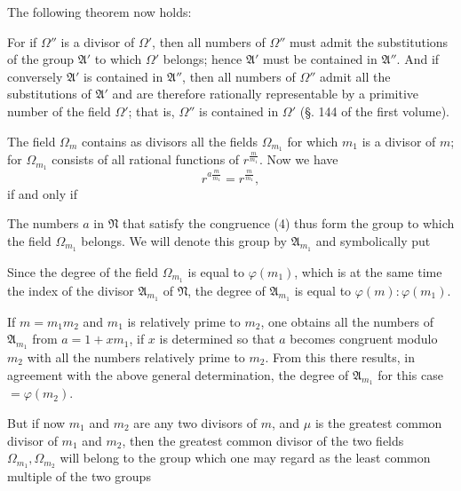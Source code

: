 The following theorem now holds:


For if $\Omega''$ is a divisor of $\Omega'$, then all numbers
of $\Omega''$ must admit the substitutions of the group $\mathfrak{A}'$ to which $\Omega'$ belongs; hence $\mathfrak{A}'$ must be contained in $\mathfrak{A}''$. And if conversely $\mathfrak{A}'$ is contained in $\mathfrak{A}''$,
then all numbers of $\Omega''$ admit
all the substitutions of $\mathfrak{A}'$ and are therefore rationally
representable by a primitive number of the field $\Omega'$; that is, $\Omega''$
is contained in $\Omega'$ (§. 144 of the first volume).

The field $\Omega_m$ contains as divisors all the fields $\Omega_{m_1}$ for
which $m_1$ is a divisor of $m$; for $\Omega_{m_1}$ consists of all
rational functions of $r^{\frac{m}{m_1}}$. Now we have
\[
r^{a\frac{m}{m_1}} = r^{\frac{m}{m_1}},
\]
if and only if

The numbers $a$ in $\mathfrak{N}$ that satisfy the congruence (4) thus
form the group to which the field $\Omega_{m_1}$ belongs. We will
denote this group by $\mathfrak{A}_{m_1}$ and symbolically put

Since the degree of the field $\Omega_{m_1}$ is equal to $\varphi(m_1)$, which is
at the same time the index of the divisor $\mathfrak{A}_{m_1}$ of $\mathfrak{N}$, the degree
of $\mathfrak{A}_{m_1}$ is equal to $\varphi(m):\varphi(m_1)$.

If $m = m_1 m_2$ and $m_1$ is relatively prime to $m_2$, one obtains
all the numbers of $\mathfrak{A}_{m_1}$ from $a = 1 + x m_1$, if $x$ is determined
so that $a$ becomes congruent modulo $m_2$ with all the numbers relatively prime to
$m_2$. From this there results, in agreement
with the above general determination, the degree of $\mathfrak{A}_{m_1}$ for
this case $=\varphi(m_2)$.

But if now $m_1$ and $m_2$ are any two divisors of $m$, and
$\mu$ is the greatest common divisor of $m_1$ and $m_2$, then
the greatest common divisor of the two fields $\Omega_{m_1}, \Omega_{m_2}$
will belong to the group which one may regard as the least common
multiple of the two groups
